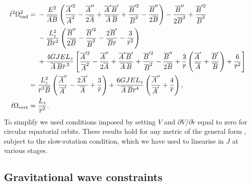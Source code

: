 \begin{align}
\dot{t}^2\Omega_\mathrm{rad}^2 = {} & -\dfrac{E^2}{\overline{A}\overline{B}} \left( \dfrac{\overline{A}'^2}{\overline{A}^2} - \dfrac{\overline{A}''}{2\overline{A}} + \dfrac{\overline{A}'\overline{B}'}{\overline{A}\,\overline{B}} + \dfrac{\overline{B}'^2}{\overline{B}^2} - \dfrac{\overline{B}''}{2\overline{B}} \right) - \dfrac{\overline{B}''}{2\overline{B}^2} +  \dfrac{\overline{B}'^2}{\overline{B}^3} \nonumber \\*
 & - {} \dfrac{L_z^2}{\overline{B}\overline{r}^2} \left(\dfrac{\overline{B}''}{2\overline{B}} - \dfrac{\overline{B}'^2}{\overline{B}^2} - \dfrac{2\overline{B}'}{\overline{B}\overline{r}}-\dfrac{3}{\overline{r}^2} \right) \nonumber \\
  & + \dfrac{4GJEL_z}{\overline{A}\,\overline{B}\overline{r}^{\,3}} \left[ \dfrac{\overline{A}'^2}{\overline{A}^2} - \dfrac{\overline{A}''}{2\overline{A}} + \dfrac{\overline{A}'\overline{B}'}{\overline{A}\,\overline{B}} + \dfrac{\overline{B}'^2}{\overline{B}^2} - \dfrac{\overline{B}''}{2\overline{B}} + \dfrac{3}{\overline{r}}\left(\dfrac{\overline{A}'}{\overline{A}}+\dfrac{\overline{B}'}{\overline{B}}\right) + \dfrac{6}{\overline{r}^2}\right] \label{eq:long_epi} \\
 = {} &  \dfrac{L_z^2}{\overline{r}^3\overline{B}}\left(\dfrac{\overline{A}''}{\overline{A}'} - \dfrac{2\overline{A}'}{\overline{A}} + \dfrac{3}{\overline{r}}\right) +\dfrac{6GJEL_z}{\overline{A}\,\overline{B} \overline{r}^4} \left(\dfrac{\overline{A}''}{\overline{A}'} + \dfrac{4}{\overline{r}}\right), \\
\dot{t}\Omega_\mathrm{vert} = {} & \dfrac{L_z}{\overline{r}^2}.
\end{align}
To simplify  we used conditions imposed by setting $V$ and $\partial V/\partial \widetilde{r}$ equal to zero for circular equatorial orbits. These results hold for any metric of the general form , subject to the slow-rotation condition, which we have used to linearise in $J$ at various stages.

\subsection{Gravitational wave constraints}\label{sec:GW-f-R}

